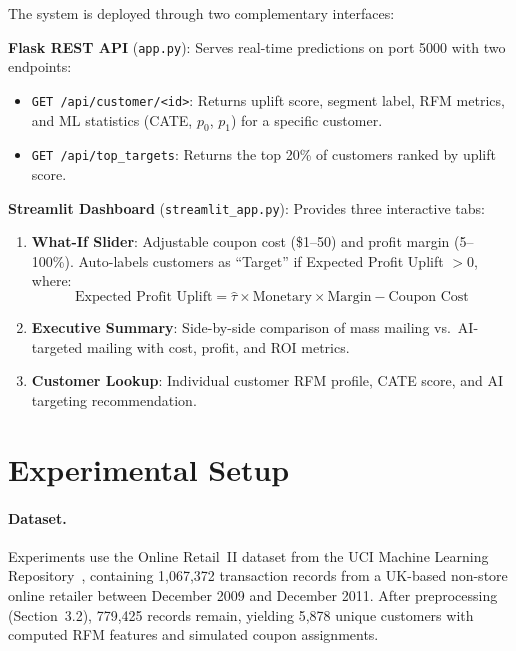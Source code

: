 \documentclass[11pt,a4paper,twoside]{article}
\begin{document}
The system is deployed through two complementary interfaces:

\textbf{Flask REST API} (\texttt{app.py}): Serves real-time predictions on port 5000 with two endpoints:
\begin{itemize}
    \item \texttt{GET /api/customer/<id>}: Returns uplift score, segment label, RFM metrics, and ML statistics (CATE, $p_0$, $p_1$) for a specific customer.
    \item \texttt{GET /api/top\_targets}: Returns the top 20\% of customers ranked by uplift score.
\end{itemize}

\textbf{Streamlit Dashboard} (\texttt{streamlit\_app.py}): Provides three interactive tabs:
\begin{enumerate}
    \item \textbf{What-If Slider}: Adjustable coupon cost (\$1--50) and profit margin (5--100\%). Auto-labels customers as ``Target'' if Expected Profit Uplift $> 0$, where:
    \begin{equation}
    \text{Expected Profit Uplift} = \hat{\tau} \times \text{Monetary} \times \text{Margin} - \text{Coupon Cost}
    \label{eq:expected_profit}
    \end{equation}
    \item \textbf{Executive Summary}: Side-by-side comparison of mass mailing vs.\ AI-targeted mailing with cost, profit, and ROI metrics.
    \item \textbf{Customer Lookup}: Individual customer RFM profile, CATE score, and AI targeting recommendation.
\end{enumerate}

\section{Experimental Setup}

\paragraph{Dataset.}
Experiments use the Online Retail~II dataset from the UCI Machine Learning Repository~\cite{chen2015}, containing 1,067,372 transaction records from a UK-based non-store online retailer between December 2009 and December 2011. After preprocessing (Section~3.2), 779,425 records remain, yielding 5,878 unique customers with computed RFM features and simulated coupon assignments.
\end{document}
